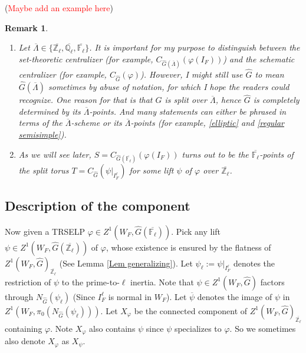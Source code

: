 \documentclass{article}
\newcommand{\red}[1]{\textcolor{red}{#1}}
\newtheorem*{remark}{Remark}
\begin{document}
    (\red{Maybe add an example here})

  \begin{remark}
  	\begin{enumerate}
  		\item Let $\overline{\Lambda} \in \{\overline{\mathbb{Z}_{\ell}}, \overline{\mathbb{Q}_{\ell}}, \overline{\mathbb{F}_{\ell}}\}$. It is important for my purpose to distinguish between the set-theoretic centralizer (for example, $C_{\hat{G}(\overline{\Lambda})}(\varphi(I_F))$) and the schematic centralizer (for example, $C_{\hat{G}}(\varphi)$). However, I might still use $\hat{G}$ to mean $\hat{G}(\overline{\Lambda})$ sometimes by abuse of notation, for which I hope the readers could recognize. One reason for that is that $\hat{G}$ is split over $\overline{\Lambda}$, hence $\hat{G}$ is completely determined by its $\overline{\Lambda}$-points. And many statements can either be phrased in terms of the $\overline{\Lambda}$-scheme or its $\overline{\Lambda}$-points (for example, \ref{elliptic} and \ref{regular semisimple}).
  		\item As we will see later, $S=C_{\hat{G}(\overline{\mathbb{F}_{\ell}})}(\varphi(I_F))$ turns out to be the $\overline{\mathbb{F}_{\ell}}$-points of the split torus $T=C_{\hat{G}}(\psi|_{I_F^{\ell}})$ for some lift $\psi$ of $\varphi$ over $\overline{\mathbb{Z}_{\ell}}$.
  	\end{enumerate}
  \end{remark}

\subsection{Description of the component}

Now given a TRSELP $\varphi \in Z^1(W_F, \hat{G}(\overline{\mathbb{F}_{\ell}}))$. Pick any lift $\psi \in Z^1(W_F, \hat{G}(\overline{\mathbb{Z}_{\ell}}))$ of $\varphi$, whose existence is ensured by the flatness of $Z^1(W_F, \hat{G})_{\overline{\mathbb{Z}_{\ell}}}$ (See Lemma \ref{Lem generalizing}). Let $\psi_{\ell}:=\psi|_{I_F^{\ell}}$ denotes the restriction of $\psi$ to the prime-to-$\ell$ inertia. Note that $\psi \in Z^1(W_F, \hat{G})$ factors through $N_{\hat{G}}(\psi_{\ell})$ (Since $I_F^{\ell}$ is normal in $W_F$). Let $\overline{\psi}$ denotes the image of $\psi$ in $Z^1(W_F, \pi_0(N_{\hat{G}}(\psi_{\ell})))$. Let $X_{\varphi}$ be the connected component of $Z^1(W_F, \hat{G})_{\overline{\mathbb{Z}_{\ell}}}$ containing $\varphi$. Note $X_{\varphi}$ also contains $\psi$ since $\psi$ specializes to $\varphi$. So we sometimes also denote $X_{\varphi}$ as $X_{\psi}$.
\end{document}
